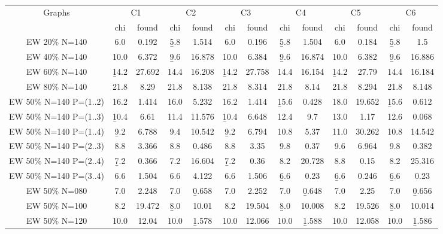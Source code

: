 \begin{sidewaystable}
\centering

\begin{tabular}{|c|cc|cc|cc|cc|cc|cc|}
\hline
\multicolumn{1}{|c|}{Graphs} & \multicolumn{2}{|c|}{C1} & \multicolumn{2}{|c|}{C2} & \multicolumn{2}{|c|}{C3} & \multicolumn{2}{|c|}{C4} & \multicolumn{2}{|c|}{C5} & \multicolumn{2}{|c|}{C6}
\\
 & chi & found & chi & found & chi & found & chi & found & chi & found & chi & found
\\
\hline
EW 20\% N=140 &  6.0 & 0.192 &  \b{5.8} & 1.514 &  6.0 & 0.196 &  \b{5.8} & 1.504 &  6.0 & 0.184 &  \b{5.8} &  1.5
\\
EW 40\% N=140 & 10.0 & 6.372 &  \b{9.6} & 16.878 & 10.0 & 6.384 &  \b{9.6} & 16.874 & 10.0 & 6.382 &  \b{9.6} & 16.886
\\
EW 60\% N=140 & \b{14.2} & 27.692 & 14.4 & 16.208 & \b{14.2} & 27.758 & 14.4 & 16.154 & \b{14.2} & 27.79 & 14.4 & 16.184
\\
EW 80\% N=140 & 21.8 & 8.29 & 21.8 & 8.138 & 21.8 & 8.314 & 21.8 & 8.14 & 21.8 & 8.294 & 21.8 & 8.148
\\
\hline
EW 50\% N=140 P=(1..2) & 16.2 & 1.414 & 16.0 & 5.232 & 16.2 & 1.414 & \b{15.6} & 0.428 & 18.0 & 19.652 & \b{15.6} & 0.612
\\
EW 50\% N=140 P=(1..3) & \b{10.4} & 6.61 & 11.4 & 11.576 & \b{10.4} & 6.648 & 12.4 &  9.7 & 13.0 & 1.17 & 12.6 & 0.068
\\
EW 50\% N=140 P=(1..4) &  \b{9.2} & 6.788 &  9.4 & 10.542 &  \b{9.2} & 6.794 & 10.8 & 5.37 & 11.0 & 30.262 & 10.8 & 14.542
\\
EW 50\% N=140 P=(2..3) &  8.8 & 3.366 &  8.8 & 0.486 &  8.8 & 3.35 &  9.8 & 0.37 &  9.6 & 6.964 &  9.8 & 0.382
\\
EW 50\% N=140 P=(2..4) &  \b{7.2} & 0.366 &  7.2 & 16.604 &  \b{7.2} & 0.36 &  8.2 & 20.728 &  8.8 & 0.15 &  8.2 & 25.316
\\
EW 50\% N=140 P=(3..4) &  6.6 & 1.504 &  6.6 & 4.122 &  6.6 & 1.506 &  \b{6.6} & 0.23 &  \b{6.6} & 0.246 &  \b{6.6} & 0.23
\\
\hline
EW 50\% N=080 &  7.0 & 2.248 &  7.0 & \b{0.658} &  7.0 & 2.252 &  7.0 & \b{0.648} &  7.0 & 2.25 &  7.0 & \b{0.656}
\\
EW 50\% N=100 &  8.2 & 19.472 &  \b{8.0} & 10.01 &  8.2 & 19.504 &  \b{8.0} & 10.008 &  8.2 & 19.526 &  \b{8.0} & 10.014
\\
EW 50\% N=120 & 10.0 & 12.04 & 10.0 & \b{1.578} & 10.0 & 12.066 & 10.0 & \b{1.588} & 10.0 & 12.058 & 10.0 & \b{1.586}

\end{tabular}
\end{sidewaystable}
